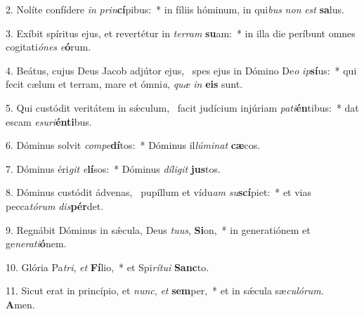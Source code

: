 2. Nolíte confídere \textit{in} \textit{prin}\textbf{cí}pibus:~*  in fíliis hóminum, in qui\textit{bus} \textit{non} \textit{est} \textbf{sa}lus.\

3. Exíbit spíritus ejus, et revertétur in \textit{ter}\textit{ram} \textbf{su}am:~*  in illa die períbunt omnes cogitati\textit{ó}\textit{nes} \textit{e}\textbf{ó}rum.\

4. Beátus, cujus Deus Jacob adjútor ejus, \dag\  spes ejus in Dómino De\textit{o} \textit{ip}\textbf{sí}us:~*  qui fecit cælum et terram, mare et ómni\textit{a}, \textit{quæ} \textit{in} \textbf{e}\textbf{is} sunt.\

5. Qui custódit veritátem in sǽculum, \dag\  facit judícium injúriam \textit{pa}\textit{ti}\textbf{én}tibus:~*  dat escam \textit{e}\textit{su}\textit{ri}\textbf{én}\textbf{ti}bus.\

6. Dóminus solvit \textit{com}\textit{pe}\textbf{dí}tos:~*  Dóminus il\textit{lú}\textit{mi}\textit{nat} \textbf{cæ}cos.\

7. Dóminus éri\textit{git} \textit{e}\textbf{lí}sos:~*  Dóminus \textit{dí}\textit{li}\textit{git} \textbf{jus}tos.\

8. Dóminus custódit ádvenas, \dag\  pupíllum et vídu\textit{am} \textit{su}\textbf{scí}piet:~*  et vias pecca\textit{tó}\textit{rum} \textit{dis}\textbf{pér}det.\

9. Regnábit Dóminus in sǽcula, Deus \textit{tu}\textit{us}, \textbf{Si}on,~*  in generatiónem et ge\textit{ne}\textit{ra}\textit{ti}\textbf{ó}nem.\

10. Glória Pa\textit{tri}, \textit{et} \textbf{Fí}lio,~*  et Spi\textit{rí}\textit{tu}\textit{i} \textbf{Sanc}to.\

11. Sicut erat in princípio, et \textit{nunc}, \textit{et} \textbf{sem}per,~*  et in sǽcula sæ\textit{cu}\textit{ló}\textit{rum}. \textbf{A}men.\

